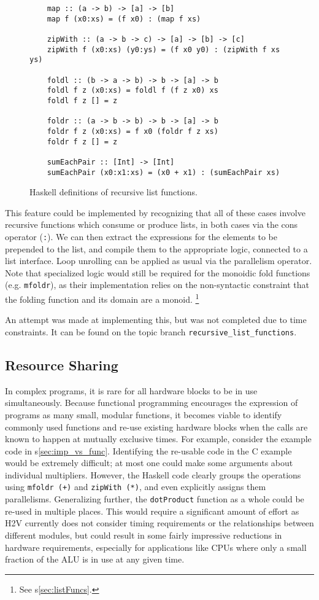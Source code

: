 \documentclass[english,onecolumn]{scrartcl}
\begin{document}
\begin{figure}
\begin{lstlisting}
    map :: (a -> b) -> [a] -> [b]
    map f (x0:xs) = (f x0) : (map f xs)

    zipWith :: (a -> b -> c) -> [a] -> [b] -> [c]
    zipWith f (x0:xs) (y0:ys) = (f x0 y0) : (zipWith f xs ys)

    foldl :: (b -> a -> b) -> b -> [a] -> b
    foldl f z (x0:xs) = foldl f (f z x0) xs
    foldl f z [] = z

    foldr :: (a -> b -> b) -> b -> [a] -> b
    foldr f z (x0:xs) = f x0 (foldr f z xs)
    foldr f z [] = z

    sumEachPair :: [Int] -> [Int]
    sumEachPair (x0:x1:xs) = (x0 + x1) : (sumEachPair xs)
\end{lstlisting}
\caption{Haskell definitions of recursive list functions.\label{lst:recListFuncs}}
\end{figure}

This feature could be implemented by recognizing that all of these cases involve recursive functions which consume or produce
lists, in both cases via the cons operator (\texttt{:}). We can then extract the expressions for the elements to be prepended to
the list, and compile them to the appropriate logic, connected to a list interface. Loop unrolling can be applied as usual via the
parallelism operator. Note that specialized logic would still be required for the monoidic fold functions (e.g. \texttt{mfoldr}),
as their implementation relies on the non-syntactic constraint that the folding function and its domain are a monoid.%
\footnote{See s\ref{sec:listFuncs}.}

An attempt was made at implementing this, but was not completed due to time constraints. It can be found on the topic branch
\texttt{recursive\_list\_functions}.


\subsection{Resource Sharing}
\label{sec:resSharing}
In complex programs, it is rare for all hardware blocks to be in use simultaneously. Because functional programming encourages
the expression of programs as many small, modular functions, it becomes viable to identify commonly used functions and re-use
existing hardware blocks when the calls are known to happen at mutually exclusive times. For example, consider the example
code in s\ref{sec:imp_vs_func}. Identifying the re-usable code in the C example would be extremely difficult; at most one could
make some arguments about individual multipliers. However, the Haskell code clearly groups the operations using
\texttt{mfoldr (+)} and \texttt{zipWith (*)}, and even explicitly assigns them parallelisms.
Generalizing further, the \texttt{dotProduct} function as a whole could be re-used in multiple places.
This would require a significant amount of effort as H2V currently does not consider timing requirements or
the relationships between different modules, but could result in some fairly impressive reductions in hardware requirements,
especially for applications like CPUs where only a small fraction of the ALU is in use at any given time.
\end{document}
